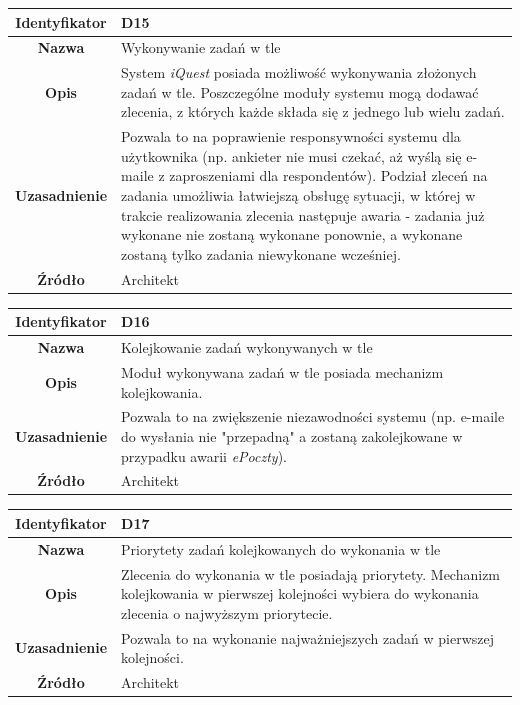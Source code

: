 \begin{table}[H]
\centering
\begin{tabular}{ | >{\bfseries}c | p{11cm} | }
\hline
%
Identyfikator & D15 \\ \hline
Nazwa & Wykonywanie zadań w tle \\ \hline
Opis & System \textit{iQuest} posiada możliwość wykonywania złożonych zadań w tle. Poszczególne moduły systemu mogą dodawać zlecenia, z których każde składa się z jednego lub wielu zadań. \\ \hline
Uzasadnienie & Pozwala to na poprawienie responsywności systemu dla użytkownika (np. ankieter nie musi czekać, aż wyślą się e-maile z zaproszeniami dla respondentów). Podział zleceń na zadania umożliwia łatwiejszą obsługę sytuacji, w której w trakcie realizowania zlecenia następuje awaria - zadania już wykonane nie zostaną wykonane ponownie, a wykonane zostaną tylko zadania niewykonane wcześniej. \\ \hline
Źródło & Architekt \\ \hline
%
\end{tabular}
\end{table}

\begin{table}[H]
\centering
\begin{tabular}{ | >{\bfseries}c | p{11cm} | }
\hline
%
Identyfikator & D16 \\ \hline
Nazwa & Kolejkowanie zadań wykonywanych w tle \\ \hline
Opis & Moduł wykonywana zadań w tle posiada mechanizm kolejkowania. \\ \hline
Uzasadnienie & Pozwala to na zwiększenie niezawodności systemu (np. e-maile do wysłania nie "przepadną" a zostaną zakolejkowane w przypadku awarii \textit{ePoczty}). \\ \hline
Źródło & Architekt \\ \hline
%
\end{tabular}
\end{table}

\begin{table}[H]
\centering
\begin{tabular}{ | >{\bfseries}c | p{11cm} | }
\hline
%
Identyfikator & D17 \\ \hline
Nazwa & Priorytety zadań kolejkowanych do wykonania w tle \\ \hline
Opis & Zlecenia do wykonania w tle posiadają priorytety. Mechanizm kolejkowania w pierwszej kolejności wybiera do wykonania zlecenia o najwyższym priorytecie. \\ \hline
Uzasadnienie & Pozwala to na wykonanie najważniejszych zadań w pierwszej kolejności. \\ \hline
Źródło & Architekt \\ \hline
%
\end{tabular}
\end{table}

